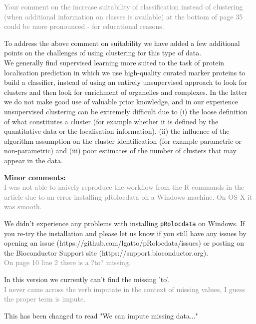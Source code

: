 \documentclass[11pt]{article}
\begin{document}
\textcolor{gray} {Your comment on the increase suitability of classification instead of clustering (when additional information on classes is available) at the bottom of page 35 could be more pronounced - for educational reasons.}

To address the above comment on suitability we have added a few additional points on the challenges of using clustering for this type of data. \\

We generally find supervised learning more suited to the task of protein localisation prediction in which we use high-quality curated marker proteins to build a classifier, instead of using an entirely unsupervised approach to look for clusters and then look for enrichment of organelles and complexes. In the latter we do not make good use of valuable prior knowledge, and in our experience unsupervised clustering can be extremely difficult due to (i) the loose definition of what constitutes a cluster (for example whether it is defined by the quantitative data or the localisation information), (ii) the influence of the algorithm assumption on the cluster identification (for example parametric or non-parametric) and (iii) poor estimates of the number of clusters that may appear in the data. \newline \newline

\textbf{Minor comments:} \\
\textcolor{gray} {I was not able to naively reproduce the workflow from the R commands in the article due to an error installing pRolocdata on a Windows machine. On OS X it was smooth.} 

We didn't experience any problems with installing \texttt{pRolocdata} on Windows. If you re-try the installation and please let us know if you still have any issues by opening an issue (https://github.com/lgatto/pRolocdata/issues) or posting on the Bioconductor Support site (https://support.bioconductor.org). \\
 
\textcolor{gray} {On page 10 line 2 there is a ?to? missing.} 

In this version we currently can't find the missing 'to'.  \\

\textcolor{gray} {I never came across the verb imputate in the context of missing values, I guess the proper term is impute.} 

This has been changed to read "We can impute missing data..." \\
\end{document}

